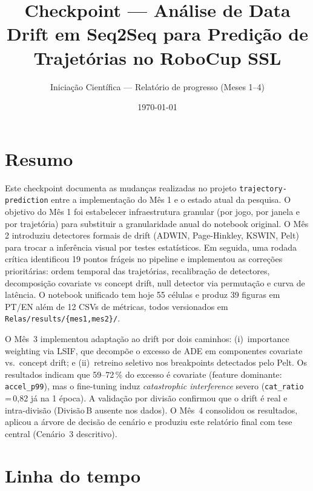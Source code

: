 \documentclass[11pt,a4paper]{article}
\title{\vspace{-1.5cm}Checkpoint --- An\'alise de Data Drift em Seq2Seq para
       Predi\c{c}\~ao de Trajet\'orias no RoboCup SSL}
\author{Iniciação Científica --- Relatório de progresso (Meses 1--4)}
\date{\today}
\begin{document}
\maketitle
\vspace{-0.6cm}

\section*{Resumo}

Este checkpoint documenta as mudan\c{c}as realizadas no projeto
\texttt{trajectory-prediction} entre a implementa\c{c}\~ao do M\^es 1 e o
estado atual da pesquisa. O objetivo do M\^es 1 foi estabelecer
infraestrutura granular (por jogo, por janela e por trajet\'oria) para
substituir a granularidade anual do notebook original. O M\^es 2
introduziu detectores formais de drift (ADWIN, Page-Hinkley, KSWIN, Pelt)
para trocar a infer\^encia visual por testes estat\'isticos. Em seguida,
uma rodada cr\'itica identificou 19 pontos fr\'ageis no pipeline e
implementou as corre\c{c}\~oes priorit\'arias: ordem temporal das
trajet\'orias, recalibra\c{c}\~ao de detectores, decomposi\c{c}\~ao
covariate vs concept drift, null detector via permuta\c{c}\~ao e curva de
lat\^encia. O notebook unificado tem hoje 55 c\'elulas e produz 39 figuras
em PT/EN al\'em de 12 CSVs de m\'etricas, todos versionados em
\texttt{Relas/results/\{mes1,mes2\}/}.

O M\^es~3 implementou adapta\c{c}\~ao ao drift por dois caminhos:
(i)~importance weighting via LSIF, que decompõe o excesso de ADE em
componentes covariate vs.\ concept drift; e (ii)~retreino seletivo
nos breakpoints detectados pelo Pelt. Os resultados indicam que 59--72\,\%
do excesso \'e covariate (feature dominante: \texttt{accel\_p99}), mas o
fine-tuning induz \emph{catastrophic interference} severo
(\texttt{cat\_ratio}\,=\,0{,}82 j\'a na 1\textordfeminine{} \'epoca). A
valida\c{c}\~ao por divis\~ao confirmou que o drift \'e real e
intra-divis\~ao (Divis\~ao\,B ausente nos dados). O M\^es~4 consolidou
os resultados, aplicou a \'arvore de decis\~ao de cen\'ario e produziu
este relat\'orio final com tese central (Cen\'ario~3 descritivo).

\section{Linha do tempo}
\end{document}
